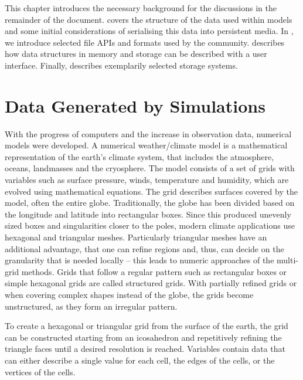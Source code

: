 \begin{chapterIntro}
This chapter introduces the necessary background for the discussions in the remainder of the document.
 covers the structure of the data used within models and some initial considerations of serialising this data into persistent media.
In , we introduce selected file APIs and formats used by the community.
 describes how data structures in memory and storage can be described with a user interface. %
Finally,  describes exemplarily selected storage systems.
\end{chapterIntro}


\section{Data Generated by Simulations}
\label{sec: Data Generated by Simulations}

With the progress of computers and the increase in observation data, numerical models were developed.
A numerical weather/climate model is a mathematical representation of the earth’s climate system, that includes the atmosphere, oceans, landmasses and the cryosphere.
The model consists of a set of grids with variables such as surface pressure, winds, temperature and humidity, which are evolved using mathematical equations.
The grid describes surfaces covered by the model,  often the entire globe.
Traditionally, the globe has been divided based on the longitude and latitude into rectangular boxes.
Since this produced unevenly sized boxes and singularities closer to the poles, modern climate applications use hexagonal and triangular meshes.
Particularly triangular meshes have an additional advantage, that one can refine regions and, thus, can decide on the granularity that is needed locally -- this leads to numeric approaches of the multi-grid methods.
Grids that follow a regular pattern such as rectangular boxes or simple hexagonal grids are called structured grids.
With partially refined grids or when covering complex shapes instead of the globe, the grids become unstructured, as they form an irregular pattern.

To create a hexagonal or triangular grid from the surface of the earth, the grid can be constructed starting from an icosahedron and repetitively refining the triangle faces until a desired resolution is reached.
Variables contain data that can either describe a single value for each cell, the edges of the cells, or the vertices of the cells.

